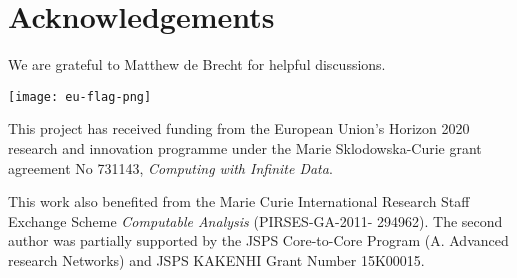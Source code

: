 \documentclass{eptcs-modified}
\begin{document}
\section*{Acknowledgements}
We are grateful to Matthew de Brecht for helpful discussions.

 \begin{minipage}{0.1\textwidth}\texttt{[image: eu-flag-png]}\end{minipage} \begin{minipage}{0.9\textwidth} This project has received funding from the European Union's Horizon 2020 research and innovation programme under the Marie Sklodowska-Curie grant agreement No 731143, \emph{Computing with Infinite Data}.\end{minipage}

 This work also benefited from the Marie Curie International Research Staff Exchange Scheme \emph{Computable
Analysis} (PIRSES-GA-2011- 294962).
 The second author was partially supported by the JSPS Core-to-Core Program (A.
Advanced research Networks) and JSPS KAKENHI Grant Number 15K00015.







\end{document}
